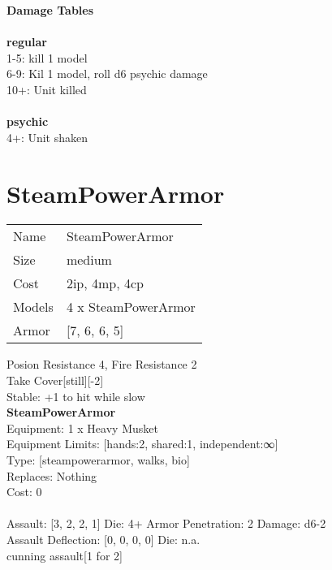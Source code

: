 {\bf Damage Tables} \\
\ \\ {\bf regular } \\
1-5: kill 1 model \\
6-9: Kil 1 model, roll d6 psychic damage \\
10+: Unit killed \\
\ \\ {\bf psychic } \\
4+: Unit shaken \\










\pagebreak\pagebreak

\section{ SteamPowerArmor }

\begin{tabular}{ll}
  Name & SteamPowerArmor \\
  Size & medium\\
  Cost & 2ip, 4mp, 4cp\\
  Models & 4 x SteamPowerArmor\\
  Armor & [7, 6, 6, 5]\\
\end{tabular}

\noindent Posion Resistance 4, Fire Resistance 2\\ 
Take Cover[still][-2]\\ 
Stable: +1 to hit while slow\\ 


{\bf SteamPowerArmor } \\
Equipment: 1 x Heavy Musket \\
Equipment Limits: [hands:2, shared:1, independent:∞] \\
Type: [steampowerarmor, walks, bio] \\
Replaces: Nothing \\
Cost: 0\\
\ \\
Assault: [3, 2, 2, 1] Die: 4+ Armor Penetration: 2 Damage: d6-2 \\
Assault Deflection: [0, 0, 0, 0] Die: n.a.\\
\indent cunning assault[1 for 2]\\ 
 
\ \\

